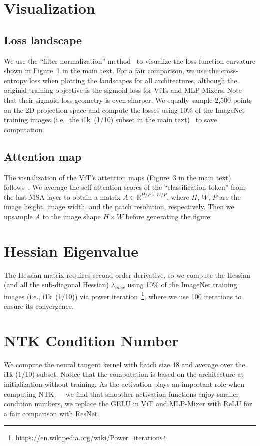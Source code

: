 \section{Visualization}
\subsection{Loss landscape}
We use the ``filter normalization'' method~\cite{li2018visualize} to visualize the loss function curvature shown in Figure~1 in the main text. %
For a fair comparison, we use the cross-entropy loss when plotting the landscapes for all architectures, although the original training objective is the sigmoid loss for ViTs and MLP-Mixers. Note that their sigmoid loss geometry is even sharper.
We equally sample 2,500 points on the 2D projection space and compute the losses using 10\% of the ImageNet training images (i.e., the i1k~(1/10) subset in the main text)~\cite{chen2020simclr} to save computation.

\subsection{Attention map}
The visualization of the ViT's attention maps (Figure~3 in the main text) %
follows~\cite{caron2021emerging}.
We average the self-attention scores of the ``classification token'' from the last MSA layer to obtain a matrix $A\in \mathbb{R}^{H/P \times W/P}$, where $H$, $W$, $P$ are the image height, image width, and the patch resolution, respectively. 
Then we upsample $A$ to the image shape $H\times W$ before generating the figure.

\section{Hessian Eigenvalue}
The Hessian matrix requires second-order derivative, so we compute the Hessian (and all the sub-diagonal Hessian) $\lambda_{max}$ using 10\% of the ImageNet training images (i.e., i1k~(1/10)) via power iteration~\footnote{\url{https://en.wikipedia.org/wiki/Power_iteration}},
where we use 100 iterations to ensure its convergence.

\section{NTK Condition Number}
We compute the neural tangent kernel with batch size 48 and average over the i1k (1/10) subset.
Notice that the computation is based on the architecture at initialization without training.
As the activation plays an important role when computing NTK --- we find that smoother activation functions enjoy smaller condition numbers, we replace the GELU in ViT and MLP-Mixer with ReLU for a fair comparison with ResNet.

